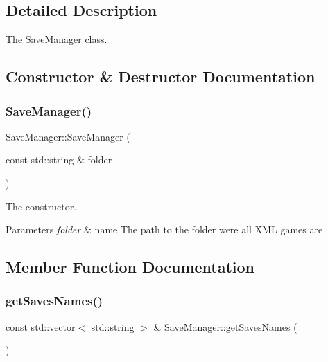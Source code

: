 \subsection{Detailed Description}
The \hyperlink{classSaveManager}{Save\+Manager} class. 

\subsection{Constructor \& Destructor Documentation}
\mbox{\label{classSaveManager_a9fe4905980e87fcd68e10471d7cf3cbc}} 
\subsubsection{\texorpdfstring{Save\+Manager()}{SaveManager()}}
{\footnotesize\ttfamily Save\+Manager\+::\+Save\+Manager (\begin{DoxyParamCaption}\item[{const std\+::string \&}]{folder }\end{DoxyParamCaption})}



The constructor. 


\begin{DoxyParams}{Parameters}
{\em folder} & name The path to the folder were all X\+ML games are \\
\hline
\end{DoxyParams}


\subsection{Member Function Documentation}
\mbox{\label{classSaveManager_aa6efa1546ec4f0d2d0212cbf49f3fb3a}} 
\subsubsection{\texorpdfstring{get\+Saves\+Names()}{getSavesNames()}}
{\footnotesize\ttfamily const std\+::vector$<$ std\+::string $>$ \& Save\+Manager\+::get\+Saves\+Names (\begin{DoxyParamCaption}{ }\end{DoxyParamCaption})}



